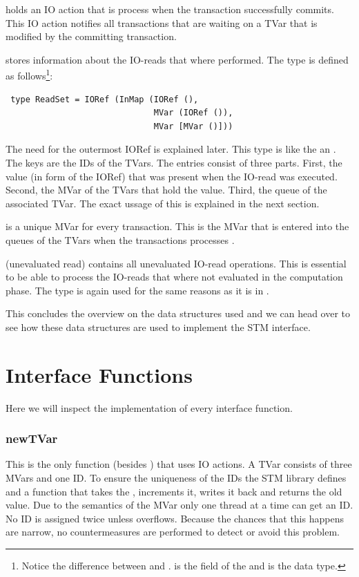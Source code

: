  holds an IO action that is process when the transaction successfully commits.
This IO action notifies all transactions that are waiting on a TVar that is modified by the 
committing transaction.

 stores information about the IO-reads that where performed. The type 
is defined as follows\footnote{Notice the difference between 
 and .  is the field of the  and 
 is the data type.}:
\begin{lstlisting}
 type ReadSet = IORef (InMap (IORef (), 
                              MVar (IORef ()), 
                              MVar [MVar ()]))
\end{lstlisting}
The need for the outermost IORef is explained later. This type is like the  an 
. The keys are the IDs of the TVars. The entries consist of three parts. First,
the value (in form of the IORef) that was present when the IO-read was executed. Second, the 
MVar of the TVars that hold the value. Third, the queue of the associated TVar.
The exact ussage of this is explained in the next section.

 is a unique MVar for every transaction. This is the MVar that is entered into
the queues of the TVars when the transactions processes .

(unevaluated read) contains all unevaluated IO-read operations. This is essential to be able to 
process the IO-reads that where not evaluated in the computation phase. The  type
is again used for the same reasons as it is in .

This concludes the overview on the data structures used and we can head over to see how these
data structures are used to implement the STM interface.





\section{Interface Functions}
\label{sec:IFFun}
Here we will inspect the implementation of every interface function. 

\subsubsection{newTVar}
\label{sec:newTVar}
This is the only function (besides ) that uses IO actions. A TVar consists of three MVars
and one ID. To ensure the uniqueness of the IDs the STM library defines 
and a function  that takes the , increments it, writes it back 
and returns the old value. Due to the semantics of the MVar only one thread at a time can get an ID. 
No ID is assigned twice unless  overflows. Because the chances that this happens 
are narrow, no countermeasures are performed to detect or avoid this problem. 

